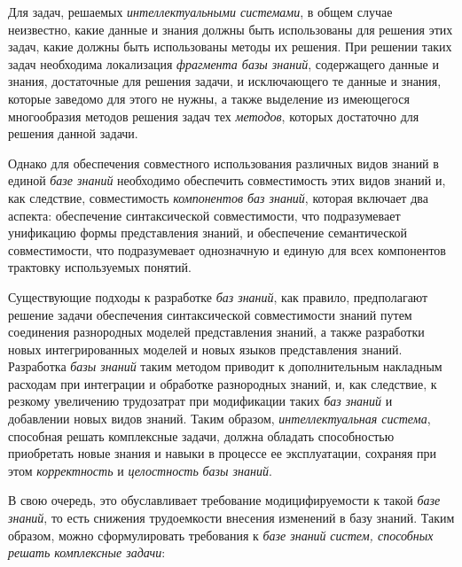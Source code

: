 Для задач, решаемых \textit{интеллектуальными системами}, в общем случае неизвестно, какие данные и знания должны быть использованы для решения этих задач, какие должны быть использованы методы их решения.
При решении таких задач необходима локализация \textit{фрагмента базы знаний}, содержащего данные и знания, достаточные для решения задачи, и исключающего те данные и знания, которые заведомо для этого не нужны, а также выделение из имеющегося многообразия методов решения задач тех \textit{методов}, которых достаточно для решения данной задачи.

Однако для обеспечения совместного использования различных видов знаний в единой \textit{базе знаний} необходимо обеспечить совместимость этих видов знаний и, как следствие, совместимость \textit{компонентов баз знаний}, которая включает два аспекта: обеспечение синтаксической совместимости, что подразумевает унификацию формы представления знаний, и обеспечение семантической совместимости, что подразумевает однозначную и единую для всех компонентов трактовку используемых понятий.

Существующие подходы к разработке \textit{баз знаний}, как правило, предполагают решение задачи обеспечения синтаксической совместимости знаний путем соединения разнородных моделей представления знаний, а также разработки новых интегрированных моделей и новых языков представления знаний.
Разработка \textit{базы знаний} таким методом приводит к дополнительным накладным расходам при интеграции и обработке разнородных знаний, и, как следствие, к резкому увеличению трудозатрат при модификации таких \textit{баз знаний} и добавлении новых видов знаний.
Таким образом, \textit{интеллектуальная система}, способная решать комплексные задачи, должна обладать способностью приобретать новые знания и навыки в процессе ее эксплуатации, сохраняя при этом \textit{корректность} и \textit{целостность} \textit{базы знаний}.

В свою очередь, это обуславливает требование модицифируемости к такой \textit{базе знаний}, то есть снижения трудоемкости внесения изменений в базу знаний.
Таким образом, можно сформулировать требования к \textit{базе знаний} \textit{систем, способных решать комплексные задачи}:


